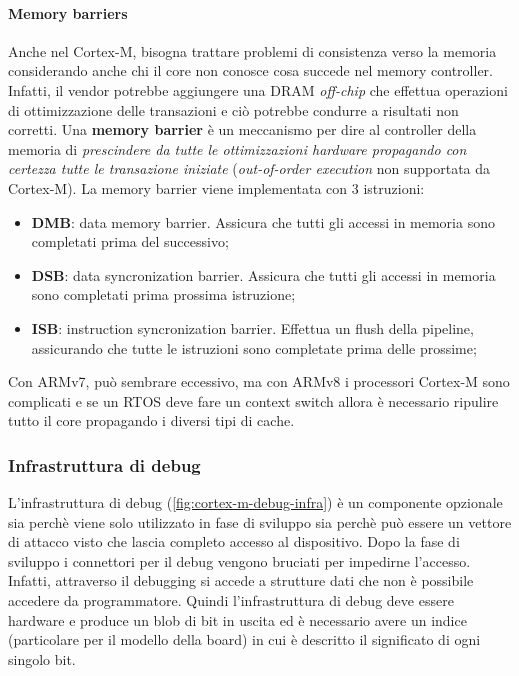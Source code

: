 \documentclass{article}
\begin{document}
\paragraph{Memory barriers} Anche nel Cortex-M, bisogna trattare problemi di consistenza verso la memoria considerando anche chi il core non conosce cosa succede nel memory controller. Infatti, il vendor potrebbe aggiungere una DRAM \textit{off-chip} che effettua operazioni di ottimizzazione delle transazioni e ciò potrebbe condurre a risultati non corretti. Una \textbf{memory barrier} è un meccanismo per dire al controller della memoria di \textit{prescindere da tutte le ottimizzazioni hardware propagando con certezza tutte le transazione iniziate} (\textit{out-of-order execution} non supportata da Cortex-M). La memory barrier viene implementata con $3$ istruzioni:
\begin{itemize}
  \item \textbf{DMB}: data memory barrier. Assicura che tutti gli accessi in memoria sono completati prima del successivo;
  \item \textbf{DSB}: data syncronization barrier. Assicura che tutti gli accessi in memoria sono completati prima prossima istruzione;
  \item \textbf{ISB}: instruction syncronization barrier. Effettua un flush della pipeline, assicurando che tutte le istruzioni sono completate prima delle prossime;
\end{itemize}

Con ARMv7, può sembrare eccessivo, ma con ARMv8 i processori Cortex-M sono complicati e se un RTOS deve fare un context switch allora è necessario ripulire tutto il core propagando i diversi tipi di cache.

\subsubsection{Infrastruttura di debug}
L'infrastruttura di debug (\cref{fig:cortex-m-debug-infra}) è un componente opzionale sia perchè viene solo utilizzato in fase di sviluppo sia perchè può essere un vettore di attacco visto che lascia completo accesso al dispositivo. Dopo la fase di sviluppo i connettori per il debug vengono bruciati per impedirne l'accesso. Infatti, attraverso il debugging si accede a strutture dati che non è possibile accedere da programmatore. Quindi l'infrastruttura di debug deve essere hardware e produce un blob di bit in uscita ed è necessario avere un indice (particolare per il modello della board) in cui è descritto il significato di ogni singolo bit.
\end{document}
